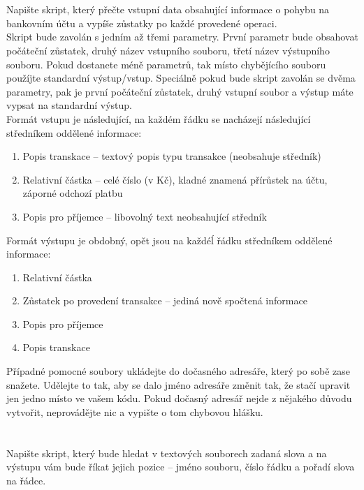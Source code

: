 \documentclass{scrartcl}
\begin{document}
        \section{}
        Napište skript, který přečte vstupní data obsahující informace o pohybu na bankovním účtu a vypíše zůstatky po každé provedené operaci.\\

        Skript bude zavolán s jedním až třemi parametry. První parametr bude obsahovat počáteční zůstatek, druhý název vstupního souboru, třetí název výstupního souboru. Pokud dostanete méně parametrů, tak místo chybějícího souboru použíjte standardní výstup/vstup. Speciálně pokud bude skript zavolán se dvěma parametry, pak je první počáteční zůstatek, druhý vstupní soubor a výstup máte vypsat na standardní výstup.\\

        Formát vstupu je následující, na každém řádku se nacházejí následující středníkem oddělené informace:
        \begin{enumerate}
                \item  Popis transkace -- textový popis typu transakce (neobsahuje středník) 
                \item  Relativní částka -- celé číslo (v Kč), kladné znamená přírůstek na účtu, záporné odchozí platbu 
                \item  Popis pro příjemce -- libovolný text neobsahující středník 
        \end{enumerate} 

        Formát výstupu je obdobný, opět jsou na každéĺ řádku středníkem oddělené informace: 
        \begin{enumerate}
                \item  Relativní částka 
                \item  Zůstatek po provedení transakce -- jediná nově spočtená informace 
                \item  Popis pro příjemce 
                \item  Popis transkace 
        \end{enumerate}

        Případné pomocné soubory ukládejte do dočasného adresáře, který po sobě zase snažete. Udělejte to tak, aby se dalo jméno adresáře změnit tak, že stačí upravit jen jedno místo ve vašem kódu. Pokud dočasný adresář nejde z nějakého důvodu vytvořit, neprovádějte nic a vypište o tom chybovou hlášku.

        \section{}
        Napište skript, který bude hledat v textových souborech zadaná slova a na výstupu vám bude říkat jejich pozice -- jméno souboru, číslo řádku a pořadí slova na řádce.\\
\end{document}
